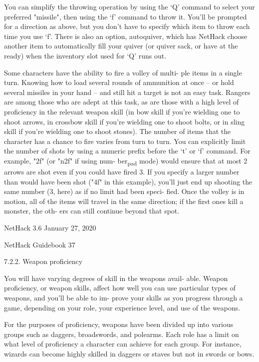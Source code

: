 \documentclass[11pt]{article}
\begin{document}
   You can simplify the throwing operation by using the `Q'
command to select your preferred "missile", then using the `f'
command to throw it.  You'll be prompted for a direction as
above, but you don't have to specify which item to throw each
time you use `f'. There is also an option, autoquiver, which has
NetHack choose another item to automatically fill your quiver (or
quiver sack, or have at the ready) when the inventory slot used
for `Q' runs out.

   Some characters have the ability to fire a volley of multi-
ple items in a single turn. Knowing how to load several rounds
of ammunition at once -- or hold several missiles in your hand --
and still hit a target is not an easy task. Rangers are among
those who are adept at this task, as are those with a high level
of proficiency in the relevant weapon skill (in bow skill if
you're wielding one to shoot arrows, in crossbow skill if you're
wielding one to shoot bolts, or in sling skill if you're wielding
one to shoot stones). The number of items that the character has
a chance to fire varies from turn to turn. You can explicitly
limit the number of shots by using a numeric prefix before the
`t' or `f' command. For example, "2f" (or "n2f" if using num-
ber\textsubscript{pad} mode) would ensure that at most 2 arrows are shot even if
you could have fired 3.  If you specify a larger number than
would have been shot ("4f" in this example), you'll just end up
shooting the same number (3, here) as if no limit had been speci-
fied. Once the volley is in motion, all of the items will travel
in the same direction; if the first ones kill a monster, the oth-
ers can still continue beyond that spot.






NetHack 3.6                   January 27, 2020





NetHack Guidebook                       37



7.2.2. Weapon proficiency

   You will have varying degrees of skill in the weapons avail-
able.  Weapon proficiency, or weapon skills, affect how well you
can use particular types of weapons, and you'll be able to im-
prove your skills as you progress through a game, depending on
your role, your experience level, and use of the weapons.

   For the purposes of proficiency, weapons have been divided
up  into various groups such as daggers, broadswords, and
polearms. Each role has a limit on what level of proficiency a
character can achieve for each group. For instance, wizards can
become highly skilled in daggers or staves but not in swords or
bows.
\end{document}
